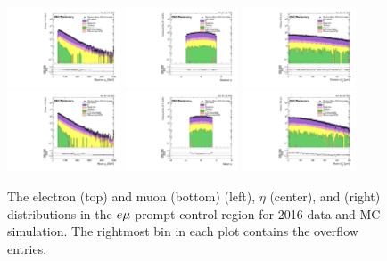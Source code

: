\begin{figure}
\centering
\includegraphics[width=0.3\textwidth]{figures/selection/pcr_emu_2016/electronPt.pdf}
\includegraphics[width=0.3\textwidth]{figures/selection/pcr_emu_2016/electronEta.pdf}
\includegraphics[width=0.3\textwidth]{figures/selection/pcr_emu_2016/electronAbsD0_50um.pdf}
\includegraphics[width=0.3\textwidth]{figures/selection/pcr_emu_2016/muonPt.pdf}
\includegraphics[width=0.3\textwidth]{figures/selection/pcr_emu_2016/muonEta.pdf}
\includegraphics[width=0.3\textwidth]{figures/selection/pcr_emu_2016/muonAbsD0_50um.pdf}
\caption{The electron (top) and muon (bottom) \pt (left), $\eta$ (center), and \ad (right) distributions in the $e{\mu}$ prompt control region for 2016 data and MC simulation. The rightmost bin in each plot contains the overflow entries.}
\label{pcr_emu_2016}
\end{figure}